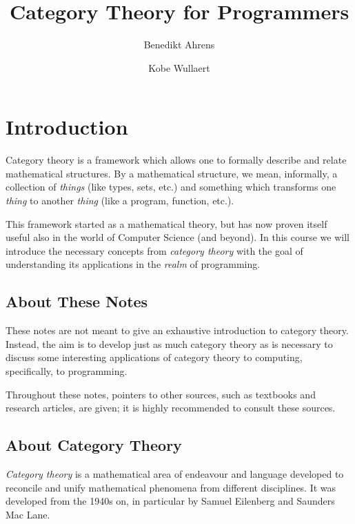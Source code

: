 \documentclass[a4paper,10pt]{scrartcl}
\title{Category Theory for Programmers}
\author{Benedikt Ahrens \and Kobe Wullaert}
\theoremstyle{plain}
\theoremstyle{definition}
\begin{document}
\maketitle

\begin{abstract}
\end{abstract}

\tableofcontents


\section{Introduction}

Category theory is a framework which allows one to formally describe and relate mathematical structures. By a mathematical structure, we mean, informally, a collection of \textit{things} (like types, sets, etc.) and something which transforms one \textit{thing} to another \textit{thing} (like a program, function, etc.).

This framework started as a mathematical theory, but has now proven itself useful also in the world of Computer Science (and beyond). In this course we will introduce the necessary concepts from \textit{category theory} with the goal of understanding its applications in the \textit{realm} of programming.


\subsection{About These Notes}

These notes are not meant to give an exhaustive introduction to category theory.
Instead, the aim is to develop just as much category theory as is necessary to discuss some interesting applications of category theory to computing, specifically, to programming.

Throughout these notes, pointers to other sources, such as textbooks and research articles, are given;
it is highly recommended to consult these sources.

\subsection{About Category Theory}

\emph{Category theory} is a mathematical area of endeavour and language developed to reconcile and unify mathematical phenomena from different disciplines.
It was developed from the 1940s on, in particular by Samuel Eilenberg and Saunders Mac Lane.
\end{document}
